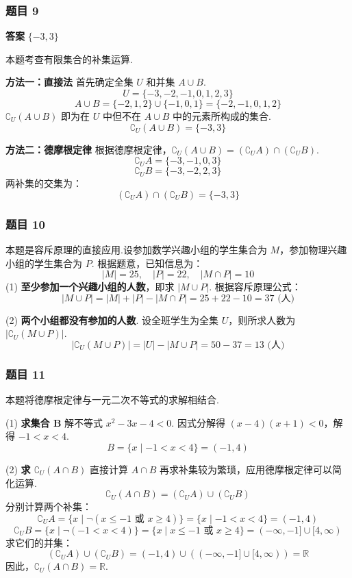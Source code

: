 \subsubsection*{题目 9}
\begin{solution}
	\textbf{答案} $\{-3, 3\}$
	
	本题考查有限集合的补集运算.
	
	\textbf{方法一：直接法}
	首先确定全集 $U$ 和并集 $A \cup B$.
	\[ U = \{-3, -2, -1, 0, 1, 2, 3\} \]
	\[ A \cup B = \{-2, 1, 2\} \cup \{-1, 0, 1\} = \{-2, -1, 0, 1, 2\} \]
	$\complement_U(A \cup B)$ 即为在 $U$ 中但不在 $A \cup B$ 中的元素所构成的集合.
	\[ \complement_U(A \cup B) = \{-3, 3\} \]
	
	\textbf{方法二：德摩根定律}
	根据德摩根定律，$\complement_U(A \cup B) = (\complement_U A) \cap (\complement_U B)$.
	\[ \complement_U A = \{-3, -1, 0, 3\} \]
	\[ \complement_U B = \{-3, -2, 2, 3\} \]
	两补集的交集为：
	\[ (\complement_U A) \cap (\complement_U B) = \{-3, 3\} \]
\end{solution}

\subsubsection*{题目 10}
\begin{solution}
	本题是容斥原理的直接应用.设参加数学兴趣小组的学生集合为 $M$，参加物理兴趣小组的学生集合为 $P$.
	根据题意，已知信息为：
	\[ |M| = 25, \quad |P| = 22, \quad |M \cap P| = 10 \]
	(1) \textbf{至少参加一个兴趣小组的人数}，即求 $|M \cup P|$.
	根据容斥原理公式：
	\[ |M \cup P| = |M| + |P| - |M \cap P| = 25 + 22 - 10 = 37 \text{ (人)} \]
	
	(2) \textbf{两个小组都没有参加的人数}.
	设全班学生为全集 $U$，则所求人数为 $|\complement_U(M \cup P)|$.
	\[ |\complement_U(M \cup P)| = |U| - |M \cup P| = 50 - 37 = 13 \text{ (人)} \]
\end{solution}

\subsubsection*{题目 11}
\begin{solution}
	本题将德摩根定律与一元二次不等式的求解相结合.
	
	(1) \textbf{求集合 B}
	解不等式 $x^2-3x-4<0$.
	因式分解得 $(x-4)(x+1)<0$，解得 $-1 < x < 4$.
	\[ B=\{x \mid -1 < x < 4\} = (-1, 4) \]
	
	(2) \textbf{求 $\complement_U(A \cap B)$}
	直接计算 $A \cap B$ 再求补集较为繁琐，应用德摩根定律可以简化运算.
	\[ \complement_U(A \cap B) = (\complement_U A) \cup (\complement_U B) \]
	分别计算两个补集：
	\[ \complement_U A = \{x \mid \neg(x \le -1 \text{ 或 } x \ge 4)\} = \{x \mid -1 < x < 4\} = (-1, 4) \]
	\[ \complement_U B = \{x \mid \neg(-1 < x < 4)\} = \{x \mid x \le -1 \text{ 或 } x \ge 4\} = (-\infty, -1] \cup [4, \infty) \]
	求它们的并集：
	\[ (\complement_U A) \cup (\complement_U B) = (-1, 4) \cup \left( (-\infty, -1] \cup [4, \infty) \right) = \mathbb{R} \]
	因此，$\complement_U(A \cap B) = \mathbb{R}$.
\end{solution}

